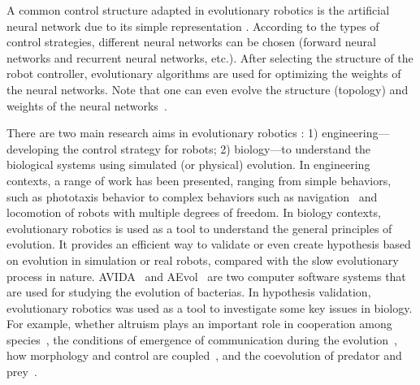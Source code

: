 A common control structure adapted in evolutionary robotics is the artificial neural network due to its simple representation \cite{Floreano_1997, Floreano2008:NN}. According to the types of control strategies, different neural networks can be chosen (forward neural networks and recurrent neural networks, etc.). After selecting the structure of the robot controller, evolutionary algorithms are used for optimizing the weights of the neural networks. Note that one can even evolve the structure (topology) and weights of the neural networks~\cite{Kenneth2002}. 

There are two main research aims in evolutionary robotics \cite{Doncieux2015}: 1) engineering---developing the control strategy for robots; 2) biology---to understand the biological systems using simulated (or physical) evolution. In engineering contexts, a range of work has been presented, ranging from simple behaviors, such as phototaxis behavior \cite{Nelson2009345} to complex behaviors such as navigation~\cite{Floreano1996} and locomotion \cite{nolfi2000evolutionary} of robots with multiple degrees of freedom. In biology contexts, evolutionary robotics is used as a tool to understand the general principles of evolution. It provides an efficient way to validate or even create hypothesis based on evolution in simulation or real robots, compared with the slow evolutionary process in nature. AVIDA~\cite{Bryson2013} and AEvol~\cite{Batut2013} are two computer software systems that are used for studying the evolution of bacterias. In hypothesis validation, evolutionary robotics was used as a tool to investigate some key issues in biology. For example, whether altruism plays an important role in cooperation among species~\cite{montanier:inria2011,Waibel2011}, the conditions of emergence of communication during the evolution~\cite{Floreano2007514}, how morphology and control are coupled~\cite{Auerbach:PLoS:2014}, and the coevolution of predator and prey~\cite{Cliff_1995, Floreano_1998}. 

